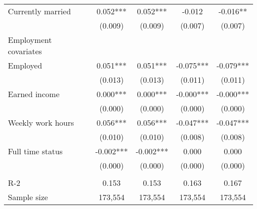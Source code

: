 \begin{tabular}{lcccc}
 Currently married   & 0.052***   & 0.052***   & -0.012   & -0.016**  \\
 & (0.009)   & (0.009)   & (0.007)   & (0.007)  \\
 Employment covariates  \\
 Employed   & 0.051***   & 0.051***   & -0.075***   & -0.079***  \\
 & (0.013)   & (0.013)   & (0.011)   & (0.011)  \\
 Earned income   & 0.000***   & 0.000***   & -0.000***   & -0.000***  \\
 & (0.000)   & (0.000)   & (0.000)   & (0.000)  \\
 Weekly work hours   & 0.056***   & 0.056***   & -0.047***   & -0.047***  \\
 & (0.010)   & (0.010)   & (0.008)   & (0.008)  \\
 Full time status   & -0.002***   & -0.002***   & 0.000   & 0.000  \\
 & (0.000)   & (0.000)   & (0.000)   & (0.000)  \\
\\
R-2 & 0.153 & 0.153 & 0.163 & 0.167 \\
Sample size & 173,554 & 173,554 & 173,554 & 173,554 \\
\bottomrule
\bottomrule
\end{tabular}